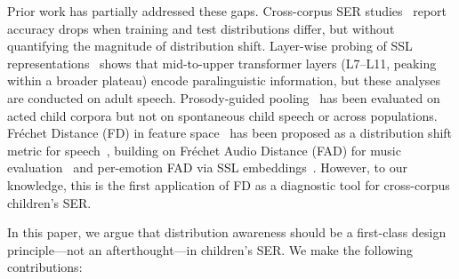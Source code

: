 \documentclass[11pt,a4paper]{article}
\begin{document}
Prior work has partially addressed these gaps. Cross-corpus SER
studies~\cite{schuller2010cross,latif2024cross} report accuracy drops when
training and test distributions differ, but without quantifying the magnitude
of distribution shift. Layer-wise probing of SSL
representations~\cite{pasad2021layer,upadhyay2024wavlm,chiu2025probing} shows that
mid-to-upper transformer layers (L7--L11, peaking within a broader plateau)
encode paralinguistic information, but these analyses are conducted on
adult speech. Prosody-guided pooling~\cite{triantafyllopoulos2023prosody} has
been evaluated on acted child corpora but not on spontaneous child speech or
across populations. Fr\'{e}chet Distance (FD) in feature
space~\cite{heusel2017gans} has been proposed as a distribution shift metric
for speech~\cite{le2024dist}, building on Fr\'echet Audio Distance (FAD) for
music evaluation~\cite{kilgour2018fad} and per-emotion FAD via SSL
embeddings~\cite{sun2024fad}. However, to our knowledge, this is the first
application of FD as a diagnostic tool for cross-corpus children's SER.

In this paper, we argue that distribution awareness should be a first-class
design principle---not an afterthought---in children's SER. We make the
following contributions:
\end{document}

